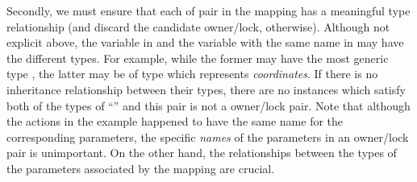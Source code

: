 
Secondly, we must ensure that each of pair in the mapping has 
a meaningful type relationship (and discard the candidate owner/lock, otherwise).
Although not explicit above, 
the variable  in  and
the variable with the same name  in 
may have the different types.
For example, while the former may have the most generic type ,
the latter may be of type  which represents {\em coordinates}.
If there is no inheritance relationship between their types, 
there are no instances which satisfy both of the types of ``''
and this pair is not a owner/lock pair.
%
Note that although the actions in the example happened to have the same name for the corresponding parameters,
the specific {\em names} of the parameters in an owner/lock pair is unimportant.
On the other hand, the relationships between the types of the parameters associated by the mapping are crucial.



